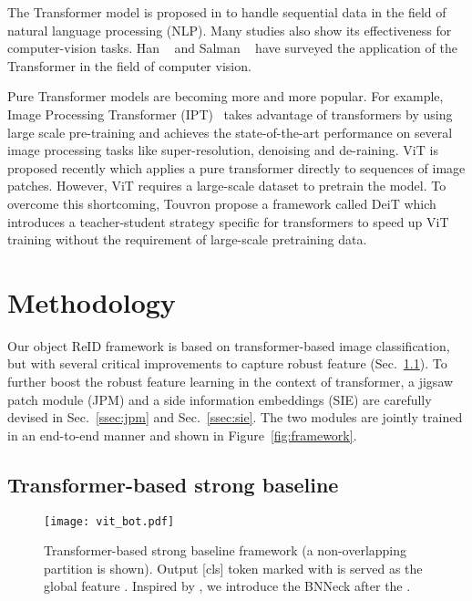 \documentclass[10pt,twocolumn,letterpaper]{article}
\begin{document}
The Transformer model is proposed in \cite{transformer} to handle sequential data in the field of natural language processing (NLP). Many studies also show its effectiveness for computer-vision tasks. Han \etal~\cite{han2020survey} and Salman \etal~\cite{khan2021transformers} have surveyed the application of the Transformer in the field of computer vision.

Pure Transformer models are becoming more and more popular. For example, Image Processing Transformer (IPT)~\cite{IPT} takes advantage of transformers by using large scale pre-training and achieves the state-of-the-art performance on several image processing tasks like super-resolution, denoising and de-raining. ViT \cite{ViT} is proposed recently  which applies a pure transformer directly to sequences of image patches. However, ViT requires a large-scale dataset to pretrain the model. To overcome this shortcoming, Touvron \etal \cite{touvron2020training} propose a framework called DeiT which introduces a teacher-student strategy specific for transformers to speed up  ViT training without the requirement of large-scale pretraining data.


 
\section{Methodology}
Our object ReID framework is based on transformer-based image classification, but with several critical improvements to capture robust feature (Sec.~\ref{ssec:strong_baseline}). To further boost the robust feature learning in the context of transformer, a jigsaw patch module (JPM) and a side information embeddings (SIE) are carefully devised in Sec.~\ref{ssec:jpm} and Sec.~\ref{ssec:sie}. The two modules are jointly trained in an end-to-end manner and shown in Figure~\ref{fig:framework}.

\subsection{Transformer-based strong baseline}
\label{ssec:strong_baseline}
\begin{figure}[ht]
\begin{center}
   \texttt{[image: vit\_bot.pdf]}
\end{center}
    \vspace{-1.em}
   \caption{Transformer-based strong baseline framework (a non-overlapping partition is shown). Output [cls] token marked with  is served as the global feature . Inspired by \cite{luo2019bag}, we introduce the BNNeck after the .}
  \label{fig:strong_baseline}
\end{figure}
\end{document}
